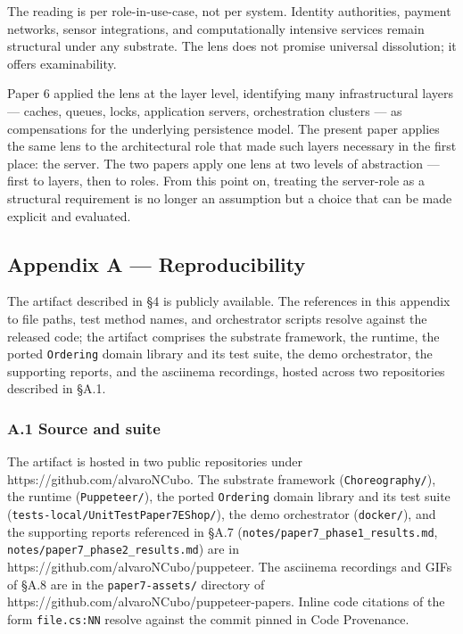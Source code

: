 \documentclass[
]{article}
\begin{document}
The reading is per role-in-use-case, not per system. Identity
authorities, payment networks, sensor integrations, and computationally
intensive services remain structural under any substrate. The lens does
not promise universal dissolution; it offers examinability.

Paper 6 applied the lens at the layer level, identifying many
infrastructural layers --- caches, queues, locks, application servers,
orchestration clusters --- as compensations for the underlying
persistence model. The present paper applies the same lens to the
architectural role that made such layers necessary in the first place:
the server. The two papers apply one lens at two levels of abstraction
--- first to layers, then to roles. From this point on, treating the
server-role as a structural requirement is no longer an assumption but a
choice that can be made explicit and evaluated.

\subsection{Appendix A ---
Reproducibility}\label{appendix-a-reproducibility}

The artifact described in §4 is publicly available. The references in
this appendix to file paths, test method names, and orchestrator scripts
resolve against the released code; the artifact comprises the substrate
framework, the runtime, the ported \texttt{Ordering} domain library and
its test suite, the demo orchestrator, the supporting reports, and the
asciinema recordings, hosted across two repositories described in §A.1.

\subsubsection{A.1 Source and suite}\label{a.1-source-and-suite}

The artifact is hosted in two public repositories under
https://github.com/alvaroNCubo. The substrate framework
(\texttt{Choreography/}), the runtime (\texttt{Puppeteer/}), the ported
\texttt{Ordering} domain library and its test suite
(\texttt{tests-local/UnitTestPaper7EShop/}), the demo orchestrator
(\texttt{docker/}), and the supporting reports referenced in §A.7
(\texttt{notes/paper7\_phase1\_results.md},
\texttt{notes/paper7\_phase2\_results.md}) are in
https://github.com/alvaroNCubo/puppeteer. The asciinema recordings and
GIFs of §A.8 are in the \texttt{paper7-assets/} directory of
https://github.com/alvaroNCubo/puppeteer-papers. Inline code citations
of the form \texttt{file.cs:NN} resolve against the commit pinned in
Code Provenance.
\end{document}
